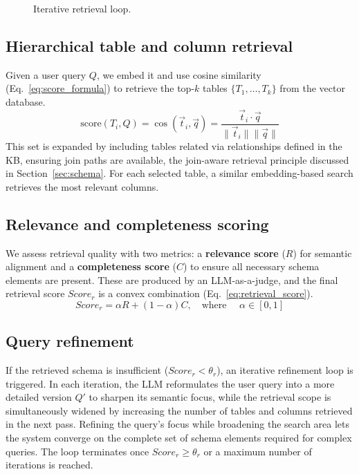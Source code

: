 \begin{figure}[ht]
{
}
\caption{Iterative retrieval loop.}
\label{fig:retrieval-loop}
\end{figure}

\subsection{Hierarchical table and column retrieval}
Given a user query $Q$, we embed it and use cosine similarity (Eq.~\ref{eq:score_formula}) to retrieve the top-$k$ tables $\{T_1, \dots, T_k\}$ from the vector database.
\begin{equation} \label{eq:score_formula}
\text{score}(T_i, Q) = \cos(\vec{t}_i, \vec{q}) = \frac{\vec{t}_i \cdot \vec{q}}{\|\vec{t}_i\| \|\vec{q}\|}
\end{equation}
This set is expanded by including tables related via relationships defined in the KB, ensuring join paths are available, the join-aware retrieval principle discussed in Section~\ref{sec:schema}. For each selected table, a similar embedding-based search retrieves the most relevant columns.

\subsection{Relevance and completeness scoring}
We assess retrieval quality with two metrics: a \textbf{relevance score} ($R$) for semantic alignment and a \textbf{completeness score} ($C$) to ensure all necessary schema elements are present. These are produced by an LLM-as-a-judge, and the final retrieval score $Score_r$ is a convex combination (Eq.~\ref{eq:retrieval_score}).
\begin{equation} \label{eq:retrieval_score}
Score_r = \alpha R + (1-\alpha) C , \quad \text{where } \quad \alpha \in [0,1]
\end{equation}

\subsection{Query refinement}
If the retrieved schema is insufficient ($Score_r < \theta_r$), an iterative refinement loop is triggered. In each iteration, the LLM reformulates the user query into a more detailed version $Q'$ to sharpen its semantic focus, while the retrieval scope is simultaneously widened by increasing the number of tables and columns retrieved in the next pass. Refining the query's focus while broadening the search area lets the system converge on the complete set of schema elements required for complex queries. The loop terminates once $Score_r \geq \theta_r$ or a maximum number of iterations is reached.

